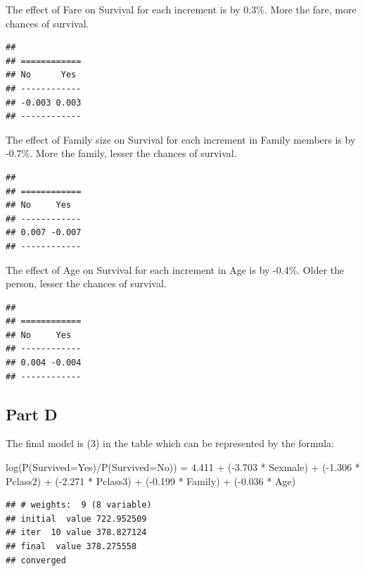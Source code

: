 \documentclass[
]{article}
\begin{document}
The effect of Fare on Survival for each increment is by 0.3\%. More the
fare, more chances of survival.

\begin{verbatim}
## 
## ============
## No      Yes 
## ------------
## -0.003 0.003
## ------------
\end{verbatim}

The effect of Family size on Survival for each increment in Family
members is by -0.7\%. More the family, lesser the chances of survival.

\begin{verbatim}
## 
## ============
## No     Yes  
## ------------
## 0.007 -0.007
## ------------
\end{verbatim}

The effect of Age on Survival for each increment in Age is by -0.4\%.
Older the person, lesser the chances of survival.

\begin{verbatim}
## 
## ============
## No     Yes  
## ------------
## 0.004 -0.004
## ------------
\end{verbatim}

\hypertarget{part-d}{%
\subsection{Part D}\label{part-d}}

The final model is (3) in the table which can be represented by the
formula:

log(P(Survived=Yes)/P(Survived=No)) = 4.411 + (-3.703 * Sexmale) +
(-1.306 * Pclass2) + (-2.271 * Pclass3) + (-0.199 * Family) + (-0.036 *
Age)

\begin{verbatim}
## # weights:  9 (8 variable)
## initial  value 722.952509 
## iter  10 value 378.827124
## final  value 378.275558 
## converged
\end{verbatim}
\end{document}
